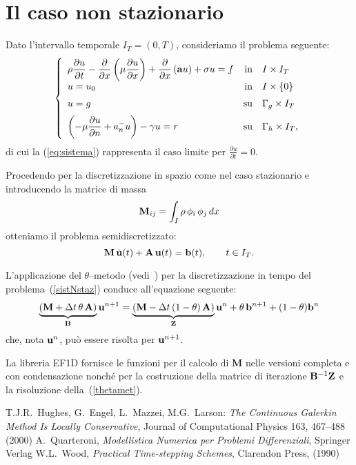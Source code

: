 \documentclass[11pt]{article}
\begin{document}
\section{Il caso non stazionario}

Dato l'intervallo temporale $I_T=(0,T)$, consideriamo il problema 
seguente:
\begin{equation}
\label{eq:sistema_nstaz}
\left \{
\begin{array}{lrl}
\displaystyle 
\rho \frac{\partial u}{\partial t}
- \frac{\partial}{\partial x} 
           \left( \mu \frac{\partial u}{\partial x} \right) + 
  \frac{\partial}{\partial x} 
           \left( {\bf a} u \right) + \sigma u = f & {\rm in} &
  I\times I_T \\[2mm]
  u = u_0 & {\rm in} & I \times \{0\} \\[2mm]
  u = g & {\rm su} & \Gamma_g \times I_T \\[2mm]
  \displaystyle \left ( -\mu \frac{\partial u}{\partial n} 
                        + a_n^- u \right) - \gamma u = r
  & {\rm su} & \Gamma_h \times I_T,
\end{array}
\right .
\end{equation}
di cui la (\ref{eq:sistema}) rappresenta il caso limite per
$\frac{\partial u}{\partial t}=0$.

Procedendo per la discretizzazione in spazio come nel caso stazionario
e introducendo la matrice di massa
$$
{\bf M}_{ij}= \int_I \rho\, \phi_i \, \phi_j \,dx
$$
otteniamo il problema semidiscretizzato:
\begin{equation}
\label{sistNstaz}
{\bf M}\,\dot{{\bf u}}(t) + {\bf A}\,{\bf u}(t) = {\bf b}(t),
\qquad t\in I_T.
\end{equation}

L'applicazione del $\theta$--metodo (vedi~\cite{Wood})
per la discretizzazione in tempo del problema~(\ref{sistNstaz}) conduce 
all'equazione seguente:
\begin{equation}
\label{thetamet}
\underbrace{({\bf M} + \Delta t\, \theta\, {\bf A})
           }_{{\bf B}}{\bf u}^{n+1} =
\underbrace{({\bf M} - \Delta t \, (1-\theta)\, {\bf A})
           }_{{\bf Z}}{\bf u}^{n} + 
	   \theta\,{\bf b}^{n+1} + (1-\theta){\bf b}^n
\end{equation}
che, nota ${\bf u}^n$, pu\`o essere risolta per ${\bf u}^{n+1}$.

La libreria EF1D fornisce le funzioni per il calcolo di {\bf M}
nelle versioni completa e con condensazione nonch\'e per la 
costruzione della matrice di iterazione ${\bf B}^{-1}{\bf Z}$ e la 
risoluzione della~(\ref{thetamet}).


\begin{thebibliography}{99}
T.J.R.~Hughes, G.~Engel, L.~Mazzei, M.G.~Larson:
{\em The Continuous Galerkin Method Is Locally Conservative},
Journal of Computational Physics 163, 467--488 (2000)
A.~Quarteroni,
{\em Modellistica Numerica per Problemi Differenziali},
Springer Verlag
W.L.~Wood,
{\em Practical Time-stepping Schemes},
Clarendon Press, (1990)
\end{thebibliography}
\end{document}
